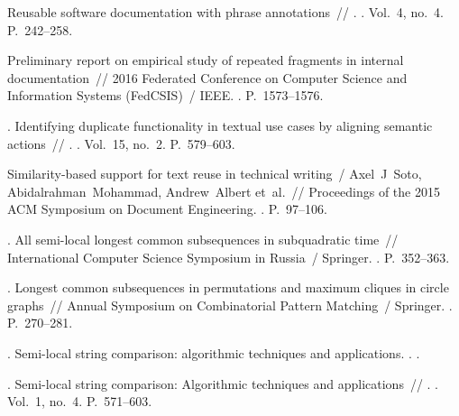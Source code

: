 \begin{thebibliography}{10}
 Reusable software documentation with
  phrase annotations~// .
  \BibDash
{}. \BibDash
\newblock Vol.~4, no.~4. \BibDash
\newblock P.~242--258.

 Preliminary report on empirical study of
  repeated fragments in internal documentation~// 2016 Federated Conference on
  Computer Science and Information Systems (FedCSIS)~/ IEEE. \BibDash
{}. \BibDash
\newblock P.~1573--1576.

. Identifying
  duplicate functionality in textual use cases by aligning semantic actions~//
  . \BibDash
{}. \BibDash
\newblock Vol.~15, no.~2. \BibDash
\newblock P.~579--603.

Similarity-based support for text reuse in technical writing~/ Axel~J~Soto,
  Abidalrahman~Mohammad, Andrew~Albert et~al.~// Proceedings of the 2015 ACM
  Symposium on Document Engineering. \BibDash
{}. \BibDash
\newblock P.~97--106.

. All semi-local longest common subsequences in
  subquadratic time~// International Computer Science Symposium in Russia~/
  Springer. \BibDash
{}. \BibDash
\newblock P.~352--363.

. Longest common subsequences in permutations and
  maximum cliques in circle graphs~// Annual Symposium on Combinatorial Pattern
  Matching~/ Springer. \BibDash
{}. \BibDash
\newblock P.~270--281.

. Semi-local string comparison: algorithmic
  techniques and applications. \BibDash
{}. \BibDash
{}.

. Semi-local string comparison: Algorithmic
  techniques and applications~// .
  \BibDash
{}. \BibDash
\newblock Vol.~1, no.~4. \BibDash
\newblock P.~571--603.


\end{thebibliography}
